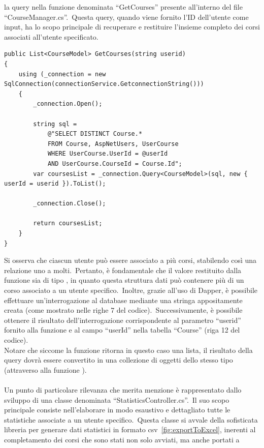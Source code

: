 la query nella funzione denominata ``GetCourses'' presente all'interno del file ``CourseManager.cs''.\ Questa query, 
quando viene fornito l'ID dell'utente come input, ha lo scopo principale di recuperare e restituire 
l'insieme completo dei corsi associati all'utente specificato.
%
\begin{lstlisting}[style=cs_style, caption=esempio funzione per l'esecuzione di una query da codice tramite il framework Dapper]
public List<CourseModel> GetCourses(string userid)
{
	using (_connection = new SqlConnection(connectionService.GetconnectionString()))
	{
		_connection.Open();

		string sql = 
			@"SELECT DISTINCT Course.* 
			FROM Course, AspNetUsers, UserCourse 
			WHERE UserCourse.UserId = @userId     
			AND UserCourse.CourseId = Course.Id";
		var coursesList = _connection.Query<CourseModel>(sql, new { userId = userid }).ToList();

		_connection.Close();

		return coursesList;
	}
} 
\end{lstlisting}
%
Si osserva che ciascun utente può essere associato a più corsi, 
stabilendo così una relazione uno a molti.\ Pertanto, è fondamentale 
che il valore restituito dalla funzione sia di tipo , 
in quanto questa struttura dati può contenere più di un corso associato a 
un utente specifico.\ Inoltre, grazie all'uso di Dapper, è possibile effettuare 
un'interrogazione al database mediante una stringa appositamente creata 
(come mostrato nelle righe 7 del codice).\ Successivamente, è possibile 
ottenere il risultato dell'interrogazione corrispondente al parametro ``userid'' 
fornito alla funzione e al campo ``userId'' nella tabella ``Course'' (riga 12 del codice).
\\
Notare che siccome la funzione ritorna in questo caso una lista, il risultato della query
dovrà essere convertito in una collezione di oggetti dello stesso tipo (attraverso alla funzione ).
%
\\ \\
%
Un punto di particolare rilevanza che merita menzione è rappresentato dallo sviluppo di una classe denominata 
``StatisticsController.cs''.\ Il suo scopo principale consiste nell'elaborare in modo esaustivo e dettagliato tutte 
le statistiche associate a un utente specifico.\ Questa classe si avvale della sofisticata libreria  
per generare dati statistici in formato csv~\ref{fig:exportToExcel}, inerenti al completamento dei corsi che sono stati non solo avviati, ma anche portati a 
